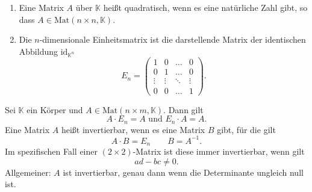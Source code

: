 \documentclass[a4paper,12pt]{article}
\numberwithin{equation}{section}
\begin{document}
\begin{enumerate}[label=(\alph*)]
        \item Eine Matrix $A$ über $\mathbb{K}$ heißt quadratisch, wenn es eine natürliche Zahl gibt, so dass $A \in \text{Mat}\left(n\times n,\mathbb{K}\right)$.
        \item Die $n$-dimensionale Einheitsmatrix ist die darstellende Matrix der identischen Abbildung $\text{id}_{\mathbb{K}^{n}}$
                \[ 
                        E_n=\left(\begin{matrix}
                                        1&0&\hdots &0\\
                                        0&1&\hdots &0\\
                                        \vdots&\vdots&\ddots&\vdots\\
                                        0&0&\hdots &1
                        \end{matrix}\right)
                .\] 
\end{enumerate}
Sei $\mathbb{K}$ ein Körper und $A \in \text{Mat}\left(n\times m,\mathbb{K}\right)$. Dann gilt
\[ 
        A\cdot E_n=A\text{ und }E_n\cdot A=A
.\] 
Eine Matrix $A$ heißt invertierbar, wenn es eine Matrix $B$ gibt, für die gilt
\[ 
        A\cdot B=E_n\qquad B=A^{-1}
.\] 
Im spezifischen Fall einer $\left(2\times2\right)$-Matrix ist diese immer invertierbar, wenn gilt
\[ 
        ad-bc\neq 0
.\] 
Allgemeiner: $A$ ist invertierbar, genau dann wenn die Determinante ungleich null ist.
\end{document}
